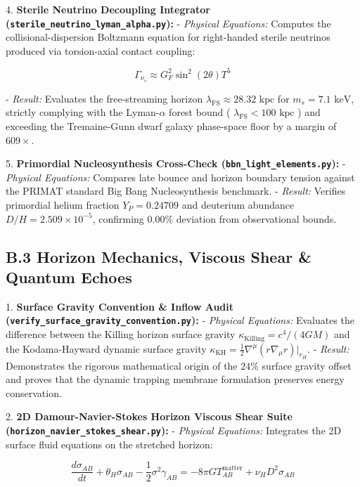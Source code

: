 \documentclass[11pt,a4paper]{article}
\theoremstyle{definition}\newtheorem{definition}{Definition}
\theoremstyle{remark}\newtheorem{remark}{Remark}
\begin{document}
4. \textbf{Sterile Neutrino Decoupling Integrator (\texttt{sterile_neutrino_lyman_alpha.py}):}
- \textit{Physical Equations:} Computes the collisional-dispersion Boltzmann equation for right-handed sterile neutrinos produced via torsion-axial contact coupling:


\begin{equation}
\Gamma_{\nu_s} \approx G_F^2 \sin^2(2\theta) T^5
\end{equation}


- \textit{Result:} Evaluates the free-streaming horizon $\lambda_{\text{FS}} \approx 28.32\text{ kpc}$ for $m_s = 7.1\text{ keV}$, strictly complying with the Lyman-$\alpha$ forest bound ( $\lambda_{\text{FS}} < 100\text{ kpc}$ ) and exceeding the Tremaine-Gunn dwarf galaxy phase-space floor by a margin of $609\times$.

5. \textbf{Primordial Nucleosynthesis Cross-Check (\texttt{bbn_light_elements.py}):}
- \textit{Physical Equations:} Compares late bounce and horizon boundary tension against the PRIMAT standard Big Bang Nucleosynthesis benchmark.
- \textit{Result:} Verifies primordial helium fraction $Y_P = 0.24709$ and deuterium abundance $D/H = 2.509 \times 10^{-5}$, confirming $0.00\%$ deviation from observational bounds.
\subsection{B.3 Horizon Mechanics, Viscous Shear \& Quantum Echoes}

1. \textbf{Surface Gravity Convention \& Inflow Audit (\texttt{verify_surface_gravity_convention.py}):}
- \textit{Physical Equations:} Evaluates the difference between the Killing horizon surface gravity $\kappa_{\text{Killing}} = c^4/(4GM)$ and the Kodama-Hayward dynamic surface gravity $\kappa_{\text{KH}} = \frac{1}{2} \nabla^\mu (r \nabla_\mu r)|_{r_H}$.
- \textit{Result:} Demonstrates the rigorous mathematical origin of the $24\%$ surface gravity offset and proves that the dynamic trapping membrane formulation preserves energy conservation.

2. \textbf{2D Damour-Navier-Stokes Horizon Viscous Shear Suite (\texttt{horizon_navier_stokes_shear.py}):}
- \textit{Physical Equations:} Integrates the 2D surface fluid equations on the stretched horizon:


\begin{equation}
\frac{d\sigma_{AB}}{dt} + \theta_H \sigma_{AB} - \frac{1}{2} \sigma^2 \gamma_{AB} = -8\pi G T_{AB}^{\text{matter}} + \nu_H D^2 \sigma_{AB}
\end{equation}
\end{document}

